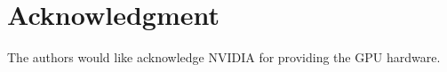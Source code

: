 \documentclass[journal,transmag]{IEEEtran}
\begin{document}
%


\appendices

\section*{Acknowledgment}


The authors would like acknowledge NVIDIA for providing the GPU hardware. 


\ifCLASSOPTIONcaptionsoff
\newpage
\fi




\end{document}
